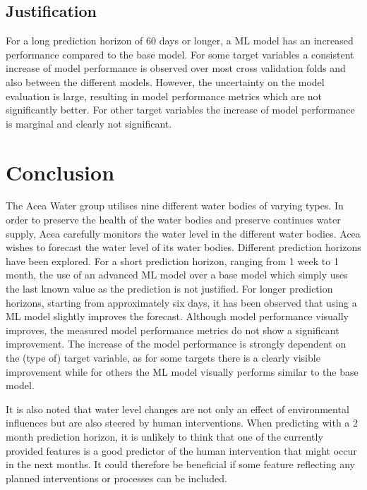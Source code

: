 \documentclass{article}
\begin{document}
\subsection*{Justification}

For a long prediction horizon of 60 days or longer, a ML model has an increased performance compared to the base model. For some target variables a consistent increase of model performance is observed over most cross validation folds and also between the different models. However, the uncertainty on the model evaluation is large, resulting in model performance metrics which are not significantly better. For other target variables the increase of model performance is marginal and clearly not significant. 

\FloatBarrier

\section{Conclusion}

The Acea Water group utilises nine different water bodies of varying types. In order to preserve the health of the water bodies and preserve continues water supply, Acea carefully monitors the water level in the different water bodies. Acea wishes to forecast the water level of its water bodies. Different prediction horizons have been explored. For a short prediction horizon, ranging from 1 week to 1 month, the use of an advanced ML model over a base model which simply uses the last known value as the prediction is not justified. For longer prediction horizons, starting from approximately six days, it has been observed that using a ML model slightly improves the forecast. Although model performance visually improves, the measured model performance metrics do not show a significant improvement. The increase of the model performance is strongly dependent on the (type of) target variable, as for some targets there is a clearly visible improvement while for others the ML model visually performs similar to the base model.

It is also noted that water level changes are not only an effect of environmental influences but are also steered by human interventions. When predicting with a 2 month prediction horizon, it is unlikely to think that one of the currently provided features is a good predictor of the human intervention that might occur in the next months. It could therefore be beneficial if some feature reflecting any planned interventions or processes can be included. 
\end{document}
